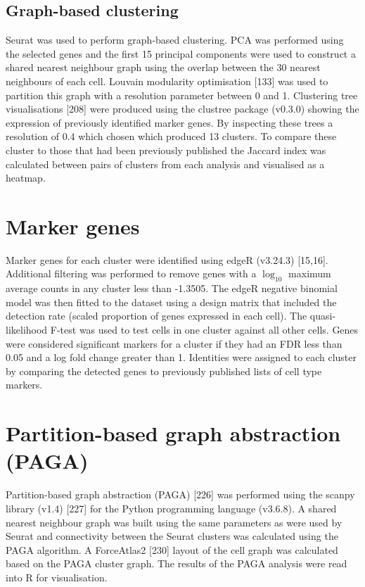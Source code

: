 \documentclass[11pt,a4paper,titlepage,twoside,openright]{style/unimelbthesis}
\theoremstyle{definition}
\theoremstyle{definition}
\theoremstyle{definition}
\theoremstyle{remark}
\begin{document}
\begin{mainmatter}
\hypertarget{graph-based-clustering}{%
\subsection{Graph-based clustering}\label{graph-based-clustering}}

Seurat was used to perform graph-based clustering. PCA was performed using the selected genes and the first 15 principal components were used to construct a shared nearest neighbour graph using the overlap between the 30 nearest neighbours of each cell. Louvain modularity optimisation {[}133{]} was used to partition this graph with a resolution parameter between 0 and 1. Clustering tree visualisations {[}208{]} were produced using the clustree package (v0.3.0) showing the expression of previously identified marker genes. By inspecting these trees a resolution of 0.4 which chosen which produced 13 clusters. To compare these cluster to those that had been previously published the Jaccard index was calculated between pairs of clusters from each analysis and visualised as a heatmap.

\hypertarget{marker-genes-1}{%
\section{Marker genes}\label{marker-genes-1}}

Marker genes for each cluster were identified using edgeR (v3.24.3) {[}15,16{]}. Additional filtering was performed to remove genes with a \(\log_{10}\) maximum average counts in any cluster less than -1.3505. The edgeR negative binomial model was then fitted to the dataset using a design matrix that included the detection rate (scaled proportion of genes expressed in each cell). The quasi-likelihood F-test was used to test cells in one cluster against all other cells. Genes were considered significant markers for a cluster if they had an FDR less than 0.05 and a log fold change greater than 1. Identities were assigned to each cluster by comparing the detected genes to previously published lists of cell type markers.

\hypertarget{partition-based-graph-abstraction-paga}{%
\section{Partition-based graph abstraction (PAGA)}\label{partition-based-graph-abstraction-paga}}

Partition-based graph abstraction (PAGA) {[}226{]} was performed using the scanpy library (v1.4) {[}227{]} for the Python programming language (v3.6.8). A shared nearest neighbour graph was built using the same parameters as were used by Seurat and connectivity between the Seurat clusters was calculated using the PAGA algorithm. A ForceAtlas2 {[}230{]} layout of the cell graph was calculated based on the PAGA cluster graph. The results of the PAGA analysis were read into R for visualisation.


\end{mainmatter}
\end{document}
